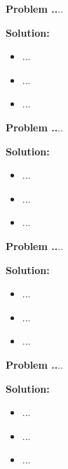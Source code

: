 \documentclass{article}
\theoremstyle{problemstyle}
\newenvironment{boxedproblem}[1]
{\begin{tcolorbox}[colback=white, colframe=black, boxrule=0.5pt]\noindent\textbf{Problem #1.}}
{\end{tcolorbox}}
\begin{document}
    
    \begin{boxedproblem}{24}
    ...
    \end{boxedproblem}
    
    \textbf{Solution:}
    \begin{itemize}[label={},leftmargin=1.25cm,nosep]
        \item ...
        \item ...
        \item ...
    \end{itemize}
    
    
    \begin{boxedproblem}{25}
    ...
    \end{boxedproblem}
    
    \textbf{Solution:}
    \begin{itemize}[label={},leftmargin=1.25cm,nosep]
        \item ...
        \item ...
        \item ...
    \end{itemize}
    
    
    \begin{boxedproblem}{26}
    ...
    \end{boxedproblem}
    
    \textbf{Solution:}
    \begin{itemize}[label={},leftmargin=1.25cm,nosep]
        \item ...
        \item ...
        \item ...
    \end{itemize}
    
    
    \begin{boxedproblem}{27}
    ...
    \end{boxedproblem}
    
    \textbf{Solution:}
    \begin{itemize}[label={},leftmargin=1.25cm,nosep]
        \item ...
        \item ...
        \item ...
    \end{itemize}
    
\end{document}
